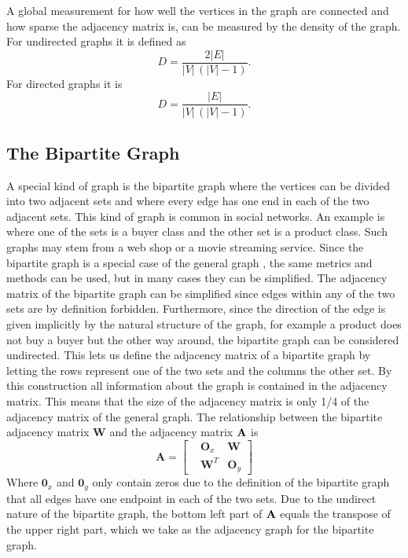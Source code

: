 
A global measurement for how well the vertices in the graph are connected and how sparse the adjacency matrix is, can be measured by the density of the graph. For undirected graphs it is defined as \cite{density}
$$D =  \frac{2|E|}{|V|\,(|V|-1)}.$$
For directed graphs it is
$$D = \frac{|E|}{|V|\,(|V|-1)}.$$

\subsection{The Bipartite Graph}\label{subsec:bigraph}
A special kind of graph is the bipartite graph where the vertices can be divided into two adjacent sets and where every edge has one end in each of the two adjacent sets. This kind of graph is common in social networks. An example is where one of the sets is a buyer class and the other set is a product class. Such graphs may stem from a web shop or a movie streaming service. Since the bipartite graph is a special case of the general graph \graph, the same metrics and methods can be used, but in many cases they can be simplified. The adjacency matrix of the bipartite graph can be simplified since edges within any of the two sets are by definition forbidden. Furthermore, since the direction of the edge is given implicitly by the natural structure of the graph, for example a product does not buy a buyer but the other way around, the bipartite graph can be considered undirected. This lets us define the adjacency matrix of a bipartite graph by letting the rows represent one of the two sets and the columns the other set. By this construction all information about the graph is contained in the adjacency matrix. This means that the size of the adjacency matrix is only 1/4 of the adjacency matrix of the general graph. The relationship between the bipartite adjacency matrix $\textbf{W}$ and the adjacency matrix $\textbf{A}$ is
$$
\textbf{A} = \left[
\begin{matrix}
  &\textbf{O}_x & \textbf{W} \\
  &\textbf{W}^T & \textbf{O}_y
\end{matrix}
\right]
$$
Where $\textbf{0}_x$ and $\textbf{0}_y$ only contain zeros due to the definition of the bipartite graph that all edges have one endpoint in each of the two sets. Due to the undirect nature of the bipartite graph, the bottom left part of $\textbf{A}$ equals the transpose of the upper right part, which we take as the adjacency graph for the bipartite graph.

